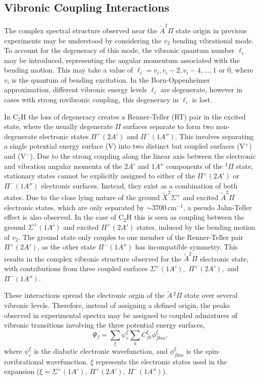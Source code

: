 \documentclass[aip,graphicx]{revtex4-1}
\begin{document}
\subsection{Vibronic Coupling Interactions}
The complex spectral structure observed near the $\tilde{A}^2\Pi$ state origin in previous experiments may be understood by considering the $v_2$ bending vibrational mode. To account for the degeneracy of this mode, the vibronic quantum number $\ell_i$ may be introduced, representing the angular momentum associated with the bending motion. This may take a value of $\ell_i = v_i, v_i-2, v_i-4,\dots,1$ or $0$, where $v_i$ is the quantum of bending excitation. In the Born-Oppenheimer approximation, different vibronic energy levels $\ell_i$ are degenerate, however in cases with strong rovibronic coupling, this degeneracy in $\ell_i$ is lost. 

In C$_2$H the loss of degeneracy creates a Renner-Teller (RT) pair in the excited state, where the usually degenerate $\Pi$ surfaces separate to form two non-degenerate electronic states $\Pi^+ (2A')$ and $\Pi^-(1A'')$. This involves separating a single potential energy surface (V) into two distinct but coupled surfaces (V$^+$) and (V$^-$). Due to the strong coupling along the linear axis between the electronic and vibration angular momenta of the $2A'$ and $1A''$ components of the $^2\Pi$ state, stationary states cannot be explicitly assigned to either of the $\Pi^+(2A')$ or $\Pi^-(1A'')$ electronic surfaces. Instead, they exist as a combination of both states. Due to the close lying nature of the ground {$\tilde{X} ^2\Sigma^+$} and excited {$\tilde{A} ^2\Pi$} electronic states, which are only separated by $\sim3700~$cm$^{-1}$, a pseudo Jahn-Teller effect is also observed. In the case of C$_2$H this is seen as coupling between the ground $\Sigma^+(1A')$ and excited $\Pi^+(2A')$ states, induced by the bending motion of $v_2$. The ground state only couples to one member of the Renner-Teller pair $\Pi^+(2A')$, as the other state $\Pi^-(1A'')$ has incompatible symmetry. This results in the complex vibronic structure observed for the $\tilde{A}^2\Pi$ electronic state, with contributions from three coupled surfaces $\Sigma^+(1A'),$ $\Pi^+(2A'),$ and $\Pi^-(1A'')$.

These interactions spread the electronic orgin of the $\tilde{A}\,^2\Pi$ state over several vibronic levels. Therefore, instead of assigning a defined origin, the peaks observed in experimental spectra may be assigned to coupled admixtures of vibronic transitions involving the three potential energy surfaces,
\begin{equation}
\Psi_f = \sum_\xi \psi_e^\xi \sum_k C_{fk}^\xi\phi_{fkm}^\xi,
\label{eq:3} 
\end{equation}
where $\psi_e^\xi$ is the diabatic electronic wavefunction, and $\phi_{fkm}^\xi$ is the spin-rovibrational wavefunction. $\xi$ represents the electronic states used in the expansion ($\xi=\Sigma^+(1A'),~\Pi^+(2A'),~\Pi^-(1A'')$).
\end{document}
